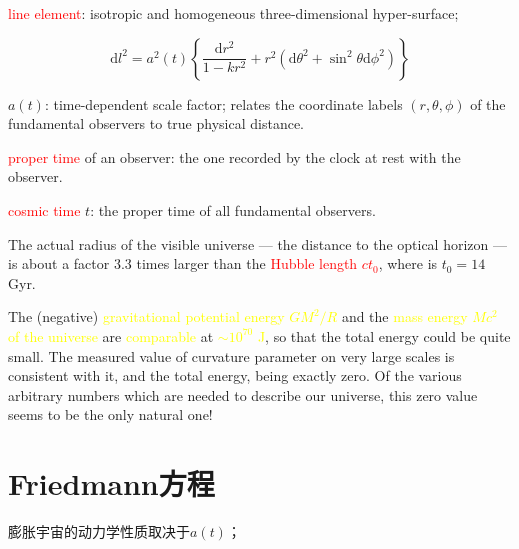 \documentclass[12pt,a4paper]{article}
\newcommand{\dif}{\mathrm{d}}
\begin{document}
\textcolor{red}{line element}: isotropic and homogeneous three-dimensional hyper-surface;

\begin{equation}
\dif l^2 = a^2(t)\left\lbrace \frac{\dif r^2}{1-kr^2} +r^2 (\dif \theta^2 + \sin^2 \theta \dif \phi^2) \right\rbrace
\end{equation}

$a(t)$: time-dependent scale factor; relates the coordinate labels $(r,\theta,\phi)$ of the fundamental observers to true physical distance.

\textcolor{red}{proper time} of an observer: the one recorded by the clock at rest with the observer.

\textcolor{red}{cosmic time} $t$: the proper time of all fundamental observers.


\cite{2015eaci.book.....S} 


\cite{perkins2008particle} The actual radius of the visible universe --- the distance to the optical horizon --- is about a factor $3.3$ times larger than the \textcolor{red}{Hubble length $c t_0$}, where is $t_0 = 14$ Gyr. 

The (negative) \textcolor{yellow}{gravitational potential energy $GM^2/R$} and the \textcolor{yellow}{mass energy $Mc^2$ of the universe} are \textcolor{yellow}{comparable} at \textcolor{yellow}{$\sim 10^{70}$ J}, so that the total energy could be quite small. The measured value of curvature parameter on very large scales is consistent with it, and the total energy, being exactly zero. Of the various arbitrary numbers which are needed to describe our universe, this zero value seems to be the only natural one!

\section{Friedmann方程}
\cite{2010宇宙大尺度结构的形成, 2012宇宙大尺度结构的形成} 膨胀宇宙的动力学性质取决于$a(t)$；
\end{document}
